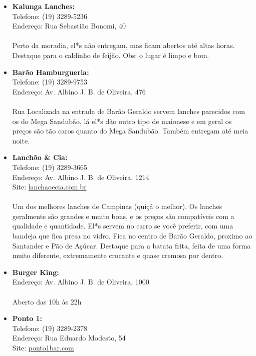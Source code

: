 \begin{itemize}
    \item   \textbf{Kalunga Lanches:}
        \\Telefone: (19) 3289-5236
        \\Endereço: Rua Sebastião Bonomi, 40
        \\\\
        Perto da moradia, el*s não entregam, mas ficam abertos até altas horas.
        Destaque para o caldinho de feijão. Obs: o lugar é limpo e bom.

    \item   \textbf{Barão Hamburgueria:}
        \\Telefone: (19) 3289-9753
        \\Endereço: Av. Albino J. B. de Oliveira, 476
        \\\\
        Rua Localizada na entrada de Barão Geraldo servem lanches parecidos com
        os do Mega Sandubão, lá el*s dão outro tipo de maionese e em geral os
        preços são tão caros quanto do Mega Sandubão. Também entregam até meia
        noite.

    \item   \textbf{Lanchão \& Cia:}
        \\Telefone: (19) 3289-3665
        \\Endereço: Av. Albino J. B. de Oliveira, 1214
        \\Site: \url{lanchaoecia.com.br}
        \\\\
        Um dos melhores lanches de Campinas (quiçá o melhor). Os lanches
        geralmente são grandes e muito bons, e os preços são compatíveis com a
        qualidade e quantidade. El*s servem no carro se você preferir, com uma
        bandeja que fica presa no vidro. Fica no centro de Barão Geraldo,
        proximo ao Santander e Pão de Açúcar. Destaque para a batata frita,
        feita de uma forma muito diferente, extremamente crocante e quase
        cremosa por dentro.

    \item   \textbf{Burger King:}
        \\Endereço: Av. Albino J. B. de Oliveira, 1000
        \\\\
        Aberto das 10h às 22h

    \item   \textbf{Ponto 1:}
        \\Telefone: (19) 3289-2378
        \\Endereço: Rua Eduardo Modesto, 54
        \\Site: \url{ponto1bar.com}


\end{itemize}
